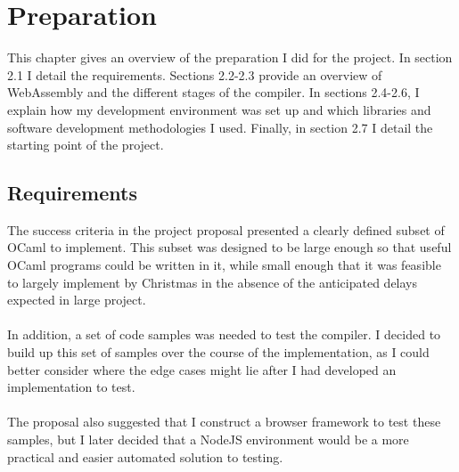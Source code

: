 \chapter{Preparation}


This chapter gives an overview of the preparation I did for the project. In section 2.1 I detail the requirements. Sections 2.2-2.3 provide an overview of WebAssembly and the different stages of the compiler. In sections 2.4-2.6, I explain how my development environment was set up and which libraries and software development methodologies I used. Finally, in section 2.7 I detail the starting point of the project.

\section{Requirements}
The success criteria in the project proposal presented a clearly defined subset of OCaml to implement. This subset was designed to be large enough so that useful OCaml programs could be written in it, while small enough that it was feasible to largely implement by Christmas in the absence of the anticipated delays expected in large project.
\\\\
In addition, a set of code samples was needed to test the compiler. I decided to build up this set of samples over the course of the implementation, as I could better consider where the edge cases might lie after I had developed an implementation to test.
\\\\
The proposal also suggested that I construct a browser framework to test these samples, but I later decided that a NodeJS environment would be a more practical and easier automated solution to testing.



